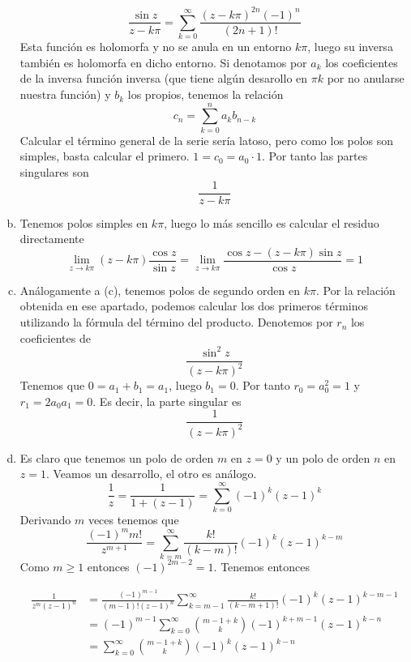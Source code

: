 \documentclass[twoside]{article}
\begin{document}
\begin{solucion}
\begin{enumerate}[(a)]
$$\frac{\sin z}{z-k\pi}= \sum_{k=0}^\infty \frac{(z-k\pi)^{2n}(-1)^{n}}{(2n+1)!} $$
Esta función es holomorfa y no se anula en un entorno $k\pi$, luego su inversa también es holomorfa en dicho entorno. Si denotamos por $a_k$ los coeficientes de la inversa función inversa (que tiene algún desarollo en $\pi k$ por no anularse nuestra función) y $b_k$ los propios, tenemos la relación
$$
c_n = \sum_{k=0}^{n}a_k b_{n-k}
$$
Calcular el término general de la serie sería latoso, pero como los polos son simples, basta calcular el primero.  $1 = c_0 = a_0 \cdot 1$. Por tanto las partes singulares son 
$$
\frac{1}{z-k\pi}
$$
\newpage
\item Tenemos polos simples en $k\pi$, luego lo más sencillo es calcular el residuo directamente
$$
\lim_{z\to k \pi}(z-k\pi)\frac{\cos z}{\sin z} = \lim_{z\to k \pi}\frac{\cos z-(z-k\pi)\sin z}{\cos z} = 1
$$
\item Análogamente a (c), tenemos polos de segundo orden en $k\pi$. Por la relación obtenida en ese apartado, podemos calcular los dos primeros términos utilizando la fórmula del término del producto. Denotemos por $r_n$ los coeficientes de 
$$\frac{\sin^2 z}{(z-k\pi)^2}$$
Tenemos que $0 = a_1 + b_1 = a_1 $, luego $b_1= 0$. Por tanto $r_0 = a_0^2 = 1$ y $r_1= 2 a_0a_1 = 0$. Es decir, la parte singular es
$$
\frac{1}{(z-k\pi)^2}
$$
\item Es claro que tenemos un polo de orden $m$ en $z=0$ y un polo de orden $n$ en $z=1$. Veamos un desarrollo, el otro es análogo.
$$
\frac{1}{z}=\frac{1}{1+(z-1)}= \sum_{k=0}^\infty (-1)^k(z-1)^k
$$
Derivando $m$ veces tenemos que
$$
\frac{(-1)^mm!}{z^{m+1}}= \sum_{k=m}^\infty \frac{k!}{(k-m)!}(-1)^k(z-1)^{k-m}
$$
Como $m\geq 1$ entonces $(-1)^{2m-2} = 1$. Tenemos entonces

\begin{align*}
\frac{1}{z^m(z-1)^n} &= \frac{(-1)^{m-1}}{(m-1)!(z-1)^n}\sum_{k=m-1}^\infty \frac{k!}{(k-m+1)!}(-1)^k(z-1)^{k-m-1}\\
& = {(-1)^{m-1}}\sum_{k=0}^\infty \binom{m-1+k}{k}(-1)^{k+m-1}(z-1)^{k-n}\\
&=\sum_{k=0}^\infty \binom{m-1+k}{k}(-1)^{k}(z-1)^{k-n}
\end{align*}
\end{enumerate}
\end{solucion}
\newpage
\end{document}
